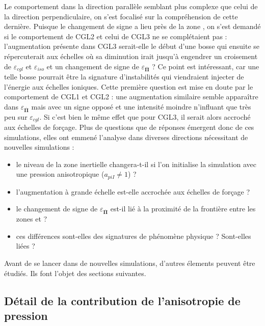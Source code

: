  Le comportement dans la direction parallèle semblant plus complexe que celui de la direction perpendiculaire, on s'est focalisé sur la compréhension de cette dernière.
 Puisque le changement de signe a lieu près de la zone , on s'est demandé si le comportement de CGL2 et celui de CGL3 ne se complétaient pas : l'augmentation présente dans CGL3 serait-elle le début d'une bosse qui ensuite se répercuterait aux échelles   où sa diminution irait jusqu'à engendrer un croisement de $\varepsilon_{cgl}$ et $\varepsilon_{iso}$ et un changement de signe de $\varepsilon_{\overline{\boldsymbol{\Pi}}}$ ? Ce point est intéressant, car une telle bosse pourrait être la signature d'instabilités qui viendraient injecter de l'énergie aux échelles ioniques. Cette première question est mise en doute par le comportement de CGL1 et CGL2 : une augmentation similaire semble apparaître dans $\varepsilon_{\overline{\boldsymbol{\Pi}}}$  mais avec un signe opposé et une intensité moindre n'influant que très peu sur $\varepsilon_{cgl}$. Si c'est bien le même effet que pour CGL3, il serait alors accroché aux échelles de forçage. 
 Plus de questions que de réponses émergent donc de ces simulations, elles ont emmené l'analyse dans diverses directions nécessitant de nouvelles simulations : 
 \begin{itemize}
     \item le niveau de la zone inertielle changera-t-il si l'on initialise la simulation avec une pression anisotropique ($a_{piI} \neq 1$) ? 
     \item l'augmentation à grande échelle est-elle accrochée aux échelles de forçage ?
    \item le changement de signe de  $\varepsilon_{\overline{\boldsymbol{\Pi}}}$ est-il lié à la proximité de la frontière entre les zones  et  ?
     \item ces différences sont-elles des signatures de phénomène physique ? Sont-elles liées ?
 \end{itemize}
 Avant de se lancer dans de nouvelles simulations, d'autres élements peuvent être étudiés. Ils font l'objet des sections suivantes.  
 
 \subsection{Détail de la contribution de l'anisotropie de pression}
 
